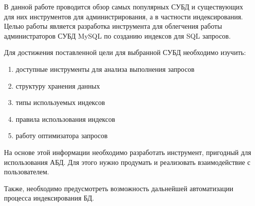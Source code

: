 В данной работе проводится обзор самых популярных СУБД и существующих для них инструментов для администрирования, а в частности индексирования.  Целью работы является разработка инструмента для облегчения работы администраторов СУБД MySQL по созданию индексов для SQL запросов.

Для достижения поставленной цели для выбранной СУБД необходимо изучить: 
\begin{enumerate}
\item доступные инструменты для анализа выполнения запросов
\item структуру хранения данных
\item типы используемых индексов
\item правила использования индексов
\item работу оптимизатора запросов
\end{enumerate}

На основе этой информации необходимо разработать инструмент, пригодный для использования АБД. Для этого нужно продумать и реализовать взаимодействие с пользователем.

Также, необходимо предусмотреть возможность дальнейшей автоматизации процесса индексирования БД.
